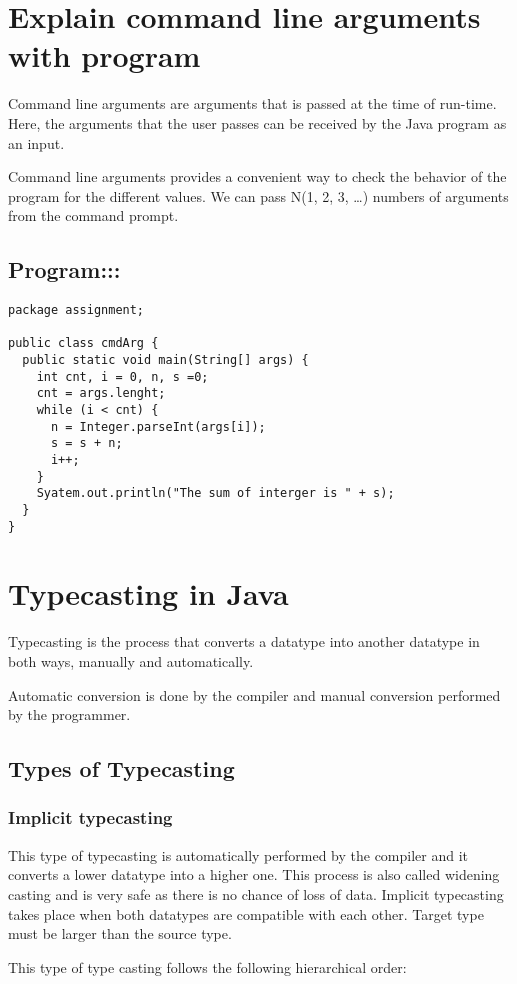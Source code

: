 \documentclass[a4paper, 12pt]{scrarticle}
\begin{document}
\section{Explain command line arguments with program}
Command line arguments are arguments that is passed at the time of run-time. Here, the arguments that the user passes can be received by the Java program as an input. 

Command line arguments provides a convenient way to check the behavior of the program for the different values. We can pass N(1, 2, 3, \dots) numbers of arguments from the command prompt.


\subsection{Program:::}
\begin{verbatim}
package assignment;

public class cmdArg {
  public static void main(String[] args) {
    int cnt, i = 0, n, s =0;
    cnt = args.lenght;
    while (i < cnt) {
      n = Integer.parseInt(args[i]);
      s = s + n;
      i++;
    }
    Syatem.out.println("The sum of interger is " + s);
  }
}
\end{verbatim}

\section{Typecasting in Java}
Typecasting is the process that converts a datatype into another datatype in both ways, manually and automatically.

Automatic conversion is done by the compiler and manual conversion performed by the programmer.

\subsection{Types of Typecasting}
\subsubsection{Implicit typecasting}
This type of typecasting is automatically performed by the compiler and it converts a lower datatype into a higher one. This process is also called widening casting and is very safe as there is no chance of loss of data. Implicit typecasting takes place when both datatypes are compatible with each
other. Target type must be larger than the source  type.

This type of type casting follows the following hierarchical order:
\end{document}
